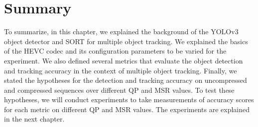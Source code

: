 \section{Summary}
\label{sec:background/summary}

To summarize, in this chapter, we explained the background of the YOLOv3 object detector and SORT for multiple object tracking. We explained the basics of the HEVC codec and its configuration parameters to be varied for the experiment. We also defined several metrics that evaluate the object detection and tracking accuracy in the context of multiple object tracking. Finally, we stated the hypotheses for the detection and tracking accuracy on uncompressed and compressed sequences over different QP and MSR values. To test these hypotheses, we will conduct experiments to take measurements of accuracy scores for each metric on different QP and MSR values. The experiments are explained in the next chapter.